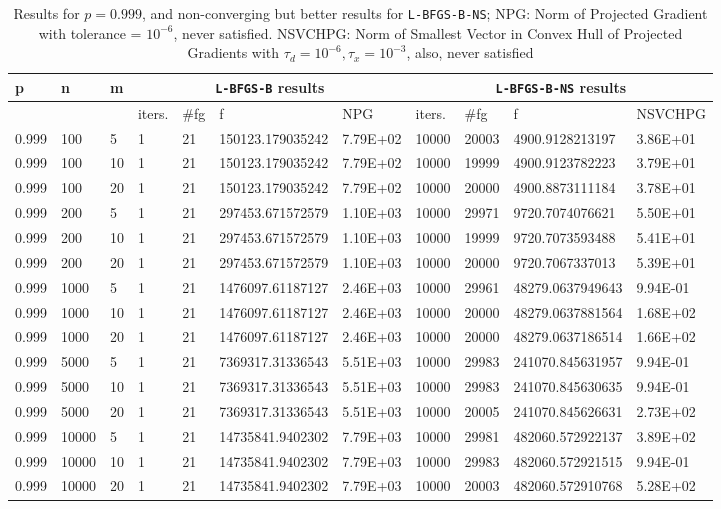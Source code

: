 \begin{table}
  \tiny
  \begin{center}
    \begin{tabular}{|l|l|l|l|l|l|l|l|l|l|l|}
      \hline
      p  & n & m  & \multicolumn{4}{|c|}{\texttt{L-BFGS-B} results} & \multicolumn{4}{|c|}{\texttt{L-BFGS-B-NS} results} \\ \hline
      &  &  & iters. & \#fg & f & NPG & iters. & \#fg & f & NSVCHPG \\ \hline
      0.999 & 100 & 5 & 1 & 21 & 150123.179035242 & 7.79E+02 & 10000 & 20003 & 4900.9128213197 & 3.86E+01\\
      0.999 & 100 & 10 & 1 & 21 & 150123.179035242 & 7.79E+02 & 10000 & 19999 & 4900.9123782223 & 3.79E+01\\
      0.999 & 100 & 20 & 1 & 21 & 150123.179035242 & 7.79E+02 & 10000 & 20000 & 4900.8873111184 & 3.78E+01\\
      0.999 & 200 & 5 & 1 & 21 & 297453.671572579 & 1.10E+03 & 10000 & 29971 & 9720.7074076621 & 5.50E+01\\
      0.999 & 200 & 10 & 1 & 21 & 297453.671572579 & 1.10E+03 & 10000 & 19999 & 9720.7073593488 & 5.41E+01\\
      0.999 & 200 & 20 & 1 & 21 & 297453.671572579 & 1.10E+03 & 10000 & 20000 & 9720.7067337013 & 5.39E+01\\
      0.999 & 1000 & 5 & 1 & 21 & 1476097.61187127 & 2.46E+03 & 10000 & 29961 & 48279.0637949643 & 9.94E-01\\
      0.999 & 1000 & 10 & 1 & 21 & 1476097.61187127 & 2.46E+03 & 10000 & 20000 & 48279.0637881564 & 1.68E+02\\
      0.999 & 1000 & 20 & 1 & 21 & 1476097.61187127 & 2.46E+03 & 10000 & 20000 & 48279.0637186514 & 1.66E+02\\
      0.999 & 5000 & 5 & 1 & 21 & 7369317.31336543 & 5.51E+03 & 10000 & 29983 & 241070.845631957 & 9.94E-01\\
      0.999 & 5000 & 10 & 1 & 21 & 7369317.31336543 & 5.51E+03 & 10000 & 29983 & 241070.845630635 & 9.94E-01\\
      0.999 & 5000 & 20 & 1 & 21 & 7369317.31336543 & 5.51E+03 & 10000 & 20005 & 241070.845626631 & 2.73E+02\\
      0.999 & 10000 & 5 & 1 & 21 & 14735841.9402302 & 7.79E+03 & 10000 & 29981 & 482060.572922137 & 3.89E+02\\
      0.999 & 10000 & 10 & 1 & 21 & 14735841.9402302 & 7.79E+03 & 10000 & 29983 & 482060.572921515 & 9.94E-01\\
      0.999 & 10000 & 20 & 1 & 21 & 14735841.9402302 & 7.79E+03 & 10000 & 20003 & 482060.572910768 & 5.28E+02\\
      \hline
    \end{tabular}
    \caption[A value where \texttt{L-BFGS-B-NS} is supposed to fail. $p = 0.999$]{Results for $p = 0.999$, and non-converging but better results for \texttt{L-BFGS-B-NS}; NPG: Norm of Projected Gradient with tolerance = $10^{-6}$, never satisfied. NSVCHPG: Norm of Smallest Vector in Convex Hull of Projected Gradients with $\tau_d = 10^{-6}, \tau_x = 10^{-3}$, also, never satisfied}
    \label{p0999}
  \end{center}
\end{table}


